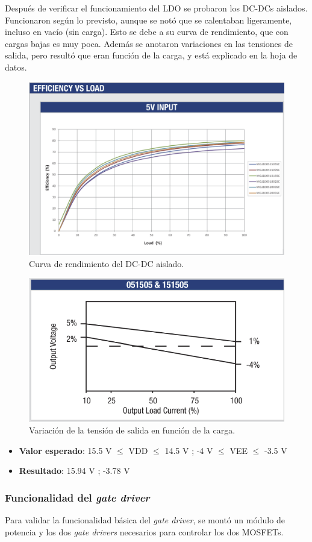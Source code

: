 Después de verificar el funcionamiento del LDO se probaron los DC-DCs aislados. Funcionaron según lo previsto, aunque se notó que se calentaban ligeramente, incluso en vacío (sin carga). Esto se debe a su curva de rendimiento, que con cargas bajas es muy poca. Además se anotaron variaciones en las tensiones de salida, pero resultó que eran función de la carga, y está explicado en la hoja de datos.

\begin{figure}[H]
	\centering
	\includegraphics[width=0.7\linewidth]{fig/DCDC-eff}
	\caption{Curva de rendimiento del DC-DC aislado.}
\end{figure}

\begin{figure}[H]
	\centering
	\includegraphics[width=0.7\linewidth]{fig/DCDC-eff1}
	\caption{Variación de la tensión de salida en función de la carga.}
\end{figure}

\begin{itemize}
	\item \textbf{Valor esperado}: 15.5 V $\le$ VDD $\le$ 14.5 V ; -4 V $\le$ VEE $\le$ -3.5 V
	\item \textbf{Resultado}: 15.94 V ; -3.78 V
\end{itemize}

\subsubsection{Funcionalidad del \textit{gate driver}}
Para validar la funcionalidad básica del \textit{gate driver}, se montó un módulo de potencia y los dos \textit{gate drivers} necesarios para controlar los dos MOSFETs.

